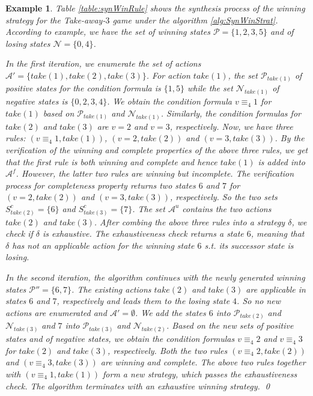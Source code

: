 \documentclass[review]{elsarticle}
\newcommand{\set}[1]{\{ #1 \}}
\newcommand{\positiveSet}{\mathcal{P}}
\newcommand{\negativeSet}{\mathcal{N}}
\newcommand{\act}{\mathcal{A}}
\newcommand{\modulo}{\equiv}
\newtheorem{example}{Example}
\begin{document}
\begin{example} \rm
    Table \ref{table:synWinRule} shows the synthesis process of the winning strategy for the Take-away-$3$ game under the algorithm \ref{alg:SynWinStrat}.
    According to example, we have the set of winning states $\positiveSet = \set{1, 2, 3, 5}$ and of losing states $\negativeSet = \set{0, 4}$.    
	
	In the first iteration, we enumerate the set of actions $\act' = \set{take(1), take(2), take(3)}$.
	For action $take(1)$, the set $\positiveSet_{take(1)}$ of positive states for the condition formula is $\set{1, 5}$ while the set $\negativeSet_{take(1)}$ of negative states is $\set{0, 2, 3, 4}$.
	We obtain the condition formula $v \modulo_4 1$ for $take(1)$ based on $\positiveSet_{take(1)}$ and $\negativeSet_{take(1)}$.
	Similarly, the condition formulas for $take(2)$ and $take(3)$ are $v = 2$ and $v = 3$, respectively.
	Now, we have three rules: $(v \modulo_4 1, take(1))$, $(v = 2, take(2))$ and $(v = 3, take(3))$.
	By the verification of the winning and complete properties of the above three rules, we get that the first rule is both winning and complete and hence $take(1)$ is added into $\act^f$.
	However, the latter two rules are winning but incomplete.
	The verification process for completeness property returns two states $6$ and $7$ for $(v = 2, take(2))$ and $(v = 3, take(3))$, respectively.
	So the two sets $S^c_{take(2)} = \set{6}$ and $S^c_{take(3)} = \set{7}$.
	The set $\act^u$ contains the two actions $take(2)$ and $take(3)$.
	After combing the above three rules into a strategy $\delta$, we check if $\delta$ is exhaustive.
	The exhaustiveness check returns a state $6$, meaning that $\delta$ has not an applicable action for the winning state $6$ s.t. its successor state is losing.
	
	

    In the second iteration, the algorithm continues with the newly generated winning states $\positiveSet'' = \set{6, 7}$.
    The existing actions $take(2)$ and $take(3)$ are applicable in states $6$ and $7$, respectively and leads them to the losing state $4$. %
    So no new actions are enumerated and $\act' = \emptyset$.
    We add the states $6$ into $\positiveSet_{take(2)}$ and $\negativeSet_{take(3)}$ and $7$ into $\positiveSet_{take(3)}$ and $\negativeSet_{take(2)}$.
    Based on the new sets of positive states and of negative states, we obtain the condition formulas $v \modulo_4 2$ and $v \modulo_4 3$ for $take(2)$ and $take(3)$, respectively.
    Both the two rules $(v \modulo_4 2, take(2))$ and $(v \modulo_4 3, take(3))$ are winning and complete.
    The above two rules together with $(v \modulo_4 1, take(1))$ form a new strategy, which passes the exhaustiveness check. 
    The algorithm terminates with an exhaustive winning strategy. \qed
\end{example}	
\end{document}
